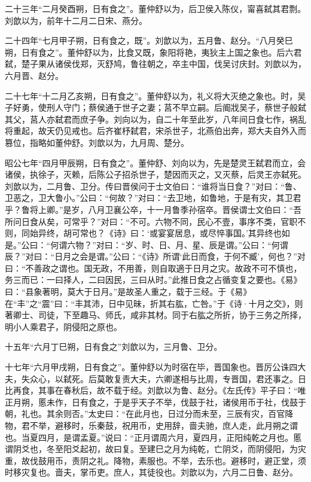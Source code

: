 \documentclass[12pt,UTF8]{ctexbook}
\begin{document}
二十三年“二月癸酉朔，日有食之”。董仲舒以为，后卫侯入陈仪，甯喜弑其君剽。刘歆以为，前年十二月二日宋、燕分。



二十四年“七月甲子朔，日有食之，既”。刘歆以为，五月鲁、赵分。“八月癸巳朔，日有食之”。董仲舒以为，比食又既，象阳将艳，夷狄主上国之象也。后六君弑，楚子果从诸侯伐郑，灭舒鸠，鲁往朝之，卒主中国，伐吴讨庆封。刘歆以为，六月晋、赵分。



二十七年“十二月乙亥朔，日有食之”。董仲舒以为，礼义将大灭绝之象也。时，吴子好勇，使刑人守门；蔡侯通于世子之妻；莒不早立嗣。后阍戕吴子，蔡世子般弑其父，莒人亦弑君而庶子争。刘向以为，自二十年至此岁，八年间日食七作，祸乱将重起，故天仍见戒也。后齐崔杼弑君，宋杀世子，北燕伯出奔，郑大夫自外入而篡位，指略如董仲舒。刘歆以为，九月周、楚分。



昭公七年“四月甲辰朔，日有食之”。董仲舒、刘向以为，先是楚灵王弑君而立，会诸侯，执徐子，灭赖，后陈公子招杀世子，楚因而灭之，又灭蔡，后灵王亦弑死。刘歆以为，二月鲁、卫分。传曰晋侯问于士文伯曰：“谁将当日食？”对曰：“鲁、卫恶之，卫大鲁小。”公曰：“何故？”对曰：“去卫地，如鲁地，于是有灾，其卫君乎？鲁将上卿。”是岁，八月卫襄公卒，十一月鲁季孙宿卒。晋侯谓士文伯曰：“吾所问日食从矣，可常乎？”对曰：“不可。六物不同，民心不壹，事序不类，官职不则，同始异终，胡可常也？《诗》曰：‘或宴宴居息，或尽悴事国。’其异终也如是。”公曰：“何谓六物？”对曰：“岁、时、日、月、星、辰是谓。”公曰：“何谓辰？”对曰：“日月之会是谓。”公曰：“《诗》所谓‘此日而食，于何不臧’，何也？”对曰：“不善政之谓也。国无政，不用善，则自取適于日月之灾。故政不可不慎也，务三而已：一曰择人，二曰因民，三曰从时。”此推日食之占循变复之要也。《易》曰：“县象著明，莫大于日月。”是故圣人重之，载于三经。于《易》在“丰”之“震”曰：“丰其沛，日中见昧，折其右肱，亡咎。”于《诗·十月之交》，则著卿士、司徒，下至趣马、师氏，咸非其材。同于右肱之所折，协于三务之所择，明小人乘君子，阴侵阳之原也。



十五年“六月丁巳朔，日有食之”刘歆以为，三月鲁、卫分。



十七年“六月甲戌朔，日有食之”。董仲舒以为时宿在毕，晋国象也。晋厉公诛四大夫，失众心，以弑死。后莫敢复责大夫，六卿遂相与比周，专晋国，君还事之。日比再食，其事在春秋后，故不载于经。刘歆以为鲁、赵分。《左氏传》平子曰：“唯正月朔，慝未作，日有食之，于是乎天子不举，伐鼓于社，诸侯用币于社，伐鼓于朝，礼也。其余则否。”太史曰：“在此月也，日过分而未至，三辰有灾，百官降物，君不举，避移时，乐秦鼓，祝用币，史用辞，啬夫驰，庶人走，此月朔之谓也。当夏四月，是谓孟夏。”说曰：“正月谓周六月，夏四月，正阳纯乾之月也。慝谓阴爻也，冬至阳爻起初，故曰复。至建巳之月为纯乾，亡阴爻，而阴侵阳，为灾重，故伐鼓用币，责阴之礼。降物，素服也。不举，去乐也。避移时，避正堂，须时移灾复也。啬夫，掌币吏。庶人，其徒役也。刘歆以为，六月二日鲁、赵分。
\end{document}
